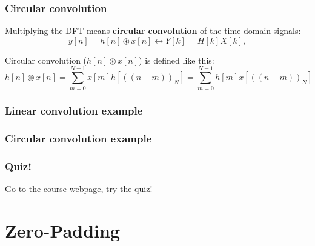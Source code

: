 \documentclass{beamer}
\begin{document}
\begin{frame}
  \frametitle{Circular convolution}

  Multiplying the DFT means {\bf circular convolution} of the time-domain signals:
  \begin{displaymath}
    y[n]=h[n]\circledast x[n] \leftrightarrow Y[k] = H[k]X[k],
  \end{displaymath}
  
  Circular convolution ($h[n]\circledast x[n]$) is defined like this:
  \begin{displaymath}
    h[n]\circledast x[n] = \sum_{m=0}^{N-1}x[m]h\left[(\!(n-m)\!)_N\right]
    = \sum_{m=0}^{N-1}h[m]x\left[(\!(n-m)\!)_N\right]
  \end{displaymath}
\end{frame}

\begin{frame}
  \frametitle{Linear convolution example}

  \centerline{}
\end{frame}

\begin{frame}
  \frametitle{Circular convolution example}

  \centerline{}
\end{frame}






\begin{frame}
  \frametitle{Quiz!}

  Go to the course webpage, try the quiz!
\end{frame}


\section[Zero-Padding]{Zero-Padding}
\setcounter{subsection}{1}
\end{document}
